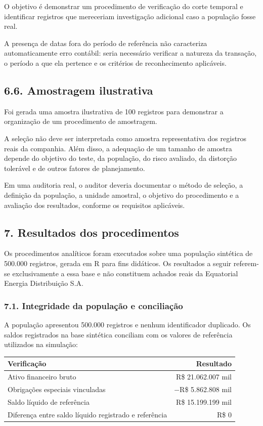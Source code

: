 \documentclass[
]{article}
\newcounter{none} %
\begin{document}
O objetivo é demonstrar um procedimento de verificação do corte temporal
e identificar registros que mereceriam investigação adicional caso a
população fosse real.

A presença de datas fora do período de referência não caracteriza
automaticamente erro contábil: seria necessário verificar a natureza da
transação, o período a que ela pertence e os critérios de reconhecimento
aplicáveis.

\subsection{6.6. Amostragem ilustrativa}\label{amostragem-ilustrativa}

Foi gerada uma amostra ilustrativa de 100 registros para demonstrar a
organização de um procedimento de amostragem.

A seleção não deve ser interpretada como amostra representativa dos
registros reais da companhia. Além disso, a adequação de um tamanho de
amostra depende do objetivo do teste, da população, do risco avaliado,
da distorção tolerável e de outros fatores de planejamento.

Em uma auditoria real, o auditor deveria documentar o método de seleção,
a definição da população, a unidade amostral, o objetivo do procedimento
e a avaliação dos resultados, conforme os requisitos aplicáveis.

\subsection{7. Resultados dos
procedimentos}\label{resultados-dos-procedimentos}

Os procedimentos analíticos foram executados sobre uma população
sintética de 500.000 registros, gerada em R para fins didáticos. Os
resultados a seguir referem-se exclusivamente a essa base e não
constituem achados reais da Equatorial Energia Distribuição S.A.

\subsubsection{7.1. Integridade da população e
conciliação}\label{integridade-da-populauxe7uxe3o-e-conciliauxe7uxe3o}

A população apresentou 500.000 registros e nenhum identificador
duplicado. Os saldos registrados na base sintética conciliam com os
valores de referência utilizados na simulação:

{\def\LTcaptype{none} %
\begin{longtable}[]{@{}lr@{}}
\toprule\noalign{}
Verificação & Resultado \\
\midrule\noalign{}
\endhead
\bottomrule\noalign{}
\endlastfoot
Ativo financeiro bruto & R\$ 21.062.007 mil \\
Obrigações especiais vinculadas & −R\$ 5.862.808 mil \\
Saldo líquido de referência & R\$ 15.199.199 mil \\
Diferença entre saldo líquido registrado e referência & R\$ 0 \\
\end{longtable}
}
\end{document}

